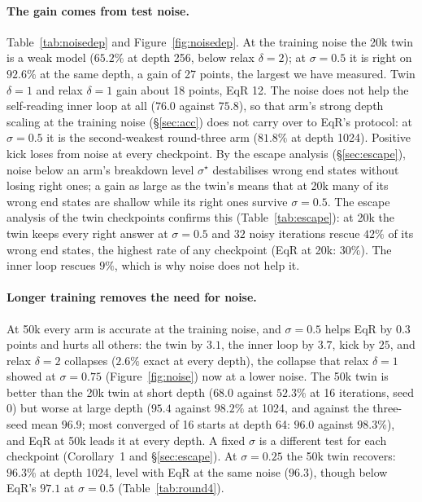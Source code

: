 \documentclass[11pt]{article}
\theoremstyle{definition}
\begin{document}
\paragraph{The gain comes from test noise.} Table~\ref{tab:noisedep} and Figure~\ref{fig:noisedep}. At the training noise the 20k twin is a
weak model ($65.2\%$ at depth 256, below relax $\delta=2$); at $\sigma=0.5$ it is right on $92.6\%$ at the same depth, a gain of 27 points, the largest
we have measured. Twin $\delta=1$ and relax $\delta=1$ gain about 18 points, EqR 12. The noise does not help the self-reading inner loop at all
($76.0$ against $75.8$), so that arm's strong depth scaling at the training noise (\S\ref{sec:acc}) does not carry over to EqR's protocol: at
$\sigma=0.5$ it is the second-weakest round-three arm ($81.8\%$ at depth 1024). Positive kick loses from noise at every checkpoint. By the escape
analysis (\S\ref{sec:escape}), noise below an arm's breakdown level $\sigma^\star$ destabilises wrong end states without losing right ones;
a gain as large as the twin's means that at 20k many of its wrong end states are shallow while its right ones survive $\sigma=0.5$. The escape
analysis of the twin checkpoints confirms this (Table~\ref{tab:escape}): at 20k the twin keeps every right answer at $\sigma=0.5$ and $32$
noisy iterations rescue $42\%$ of its wrong end states, the highest rate of any checkpoint (EqR at 20k: $30\%$). The inner loop rescues
$9\%$, which is why noise does not help it.

\paragraph{Longer training removes the need for noise.} At 50k every arm is accurate at the training noise, and $\sigma=0.5$ helps EqR by
$0.3$ points and hurts all others: the twin by $3.1$, the inner loop by $3.7$, kick by $25$, and relax $\delta=2$ collapses ($2.6\%$ exact at every
depth), the collapse that relax $\delta=1$ showed at $\sigma=0.75$ (Figure~\ref{fig:noise}) now at a lower noise. The 50k twin is better than the
20k twin at short depth ($68.0$ against $52.3\%$ at 16 iterations, seed 0) but worse at large depth ($95.4$ against $98.2\%$ at 1024, and
against the three-seed mean $96.9$; most converged of 16 starts at depth 64: $96.0$ against $98.3\%$), and EqR at 50k leads it at every depth. A fixed $\sigma$ is a different test for each checkpoint
(Corollary~1 and \S\ref{sec:escape}). At $\sigma=0.25$ the 50k twin recovers: $96.3\%$ at depth 1024, level with EqR at the same noise
($96.3$), though below EqR's $97.1$ at $\sigma=0.5$ (Table~\ref{tab:round4}).
\end{document}
